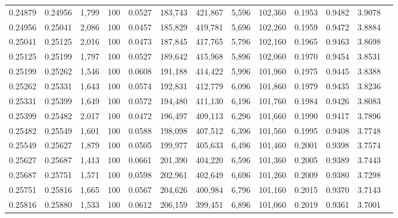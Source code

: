 \begin{tabular}{rrrrrrrrrrrrr}
0.24879 & 0.24956 &  1,799 & 100 &                                     0.0527 & 183,743 & 421,867 &   5,596 & 102,360 & 0.1953 & 0.9482 & 3.9078 \\
0.24956 & 0.25041 &  2,086 & 100 &                                     0.0457 & 185,829 & 419,781 &   5,696 & 102,260 & 0.1959 & 0.9472 & 3.8884 \\
0.25041 & 0.25125 &  2,016 & 100 &                                     0.0473 & 187,845 & 417,765 &   5,796 & 102,160 & 0.1965 & 0.9463 & 3.8698 \\
0.25125 & 0.25199 &  1,797 & 100 &                                     0.0527 & 189,642 & 415,968 &   5,896 & 102,060 & 0.1970 & 0.9454 & 3.8531 \\
0.25199 & 0.25262 &  1,546 & 100 &                                     0.0608 & 191,188 & 414,422 &   5,996 & 101,960 & 0.1975 & 0.9445 & 3.8388 \\
0.25262 & 0.25331 &  1,643 & 100 &                                     0.0574 & 192,831 & 412,779 &   6,096 & 101,860 & 0.1979 & 0.9435 & 3.8236 \\
0.25331 & 0.25399 &  1,649 & 100 &                                     0.0572 & 194,480 & 411,130 &   6,196 & 101,760 & 0.1984 & 0.9426 & 3.8083 \\
0.25399 & 0.25482 &  2,017 & 100 &                                     0.0472 & 196,497 & 409,113 &   6,296 & 101,660 & 0.1990 & 0.9417 & 3.7896 \\
0.25482 & 0.25549 &  1,601 & 100 &                                     0.0588 & 198,098 & 407,512 &   6,396 & 101,560 & 0.1995 & 0.9408 & 3.7748 \\
0.25549 & 0.25627 &  1,879 & 100 &                                     0.0505 & 199,977 & 405,633 &   6,496 & 101,460 & 0.2001 & 0.9398 & 3.7574 \\
0.25627 & 0.25687 &  1,413 & 100 &                                     0.0661 & 201,390 & 404,220 &   6,596 & 101,360 & 0.2005 & 0.9389 & 3.7443 \\
0.25687 & 0.25751 &  1,571 & 100 &                                     0.0598 & 202,961 & 402,649 &   6,696 & 101,260 & 0.2009 & 0.9380 & 3.7298 \\
0.25751 & 0.25816 &  1,665 & 100 &                                     0.0567 & 204,626 & 400,984 &   6,796 & 101,160 & 0.2015 & 0.9370 & 3.7143 \\
0.25816 & 0.25880 &  1,533 & 100 &                                     0.0612 & 206,159 & 399,451 &   6,896 & 101,060 & 0.2019 & 0.9361 & 3.7001 \\

\end{tabular}
